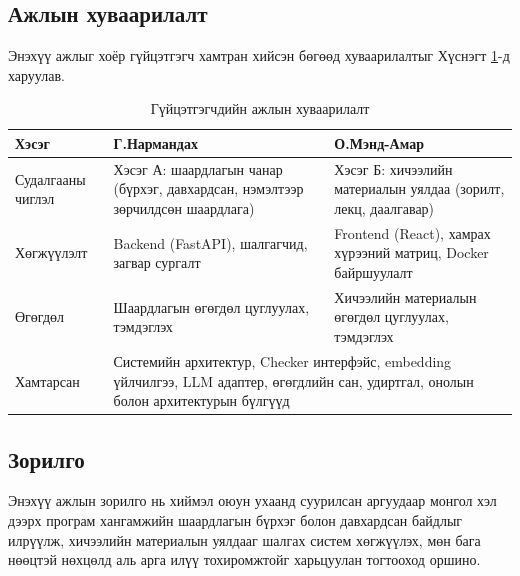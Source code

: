 \subsection*{Ажлын хуваарилалт}
Энэхүү ажлыг хоёр гүйцэтгэгч хамтран хийсэн бөгөөд хуваарилалтыг Хүснэгт \ref{tab:huvaarilalt}-д харуулав.

\begin{table}[H]
\centering
\caption{Гүйцэтгэгчдийн ажлын хуваарилалт}
\label{tab:huvaarilalt}
\begin{tabular}{|p{3.2cm}|p{5.6cm}|p{5.6cm}|}
\hline
\textbf{Хэсэг} & \textbf{Г.Нармандах} & \textbf{О.Мэнд-Амар} \\ \hline
Судалгааны чиглэл & Хэсэг А: шаардлагын чанар (бүрхэг, давхардсан, нэмэлтээр зөрчилдсөн шаардлага) & Хэсэг Б: хичээлийн материалын уялдаа (зорилт, лекц, даалгавар) \\ \hline
Хөгжүүлэлт & Backend (FastAPI), шалгагчид, загвар сургалт & Frontend (React), хамрах хүрээний матриц, Docker байршуулалт \\ \hline
Өгөгдөл & Шаардлагын өгөгдөл цуглуулах, тэмдэглэх & Хичээлийн материалын өгөгдөл цуглуулах, тэмдэглэх \\ \hline
Хамтарсан & \multicolumn{2}{p{11.2cm}|}{Системийн архитектур, Checker интерфэйс, embedding үйлчилгээ, LLM адаптер, өгөгдлийн сан, удиртгал, онолын болон архитектурын бүлгүүд} \\ \hline
\end{tabular}
\end{table}

\subsection*{Зорилго}
Энэхүү ажлын зорилго нь хиймэл оюун ухаанд суурилсан аргуудаар монгол хэл дээрх програм хангамжийн шаардлагын бүрхэг болон давхардсан байдлыг илрүүлж, хичээлийн материалын уялдааг шалгах систем хөгжүүлэх, мөн бага нөөцтэй нөхцөлд аль арга илүү тохиромжтойг харьцуулан тогтооход оршино.

